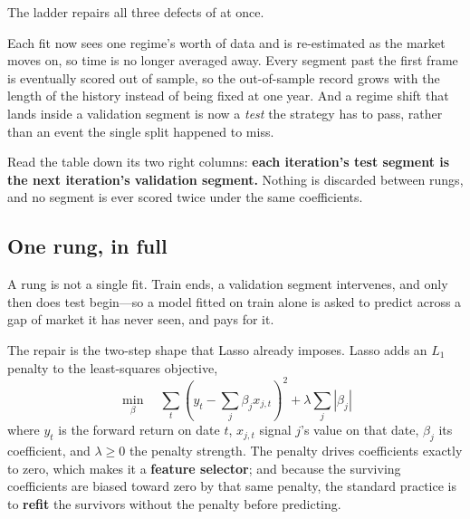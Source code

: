 \begin{claim}\label{clm:ladder-repairs}
The ladder repairs all three defects of  at once.
\end{claim}

Each fit now sees one regime's worth of data and is re-estimated as the market moves on, so time
is no longer averaged away. Every segment past the first frame is eventually scored out of sample,
so the out-of-sample record grows with the length of the history instead of being fixed at one
year. And a regime shift that lands inside a validation segment is now a \emph{test} the strategy
has to pass, rather than an event the single split happened to miss.

\begin{note}
Read the table down its two right columns: \textbf{each iteration's test segment is the next
iteration's validation segment.} Nothing is discarded between rungs, and no segment is ever scored
twice under the same coefficients.
\end{note}

\subsection{One rung, in full}\label{sec:one-rung}

A rung is not a single fit. Train ends, a validation segment intervenes, and only then does test
begin---so a model fitted on train alone is asked to predict across a gap of market it has never
seen, and pays for it.

The repair is the two-step shape that Lasso already imposes. Lasso adds an $L_1$ penalty to the
least-squares objective,
\[
  \min_{\beta} \quad \sum_t \left( y_t - \sum_j \beta_j x_{j,t} \right)^{2}
    + \lambda \sum_j \left| \beta_j \right|
\]
where $y_t$ is the forward return on date $t$, $x_{j,t}$ signal $j$'s value on that date,
$\beta_j$ its coefficient, and $\lambda \geq 0$ the penalty strength. The penalty drives
coefficients exactly to zero, which makes it a \textbf{feature selector}; and because the
surviving coefficients are biased toward zero by that same penalty, the standard practice is to
\textbf{refit} the survivors without the penalty before predicting.


